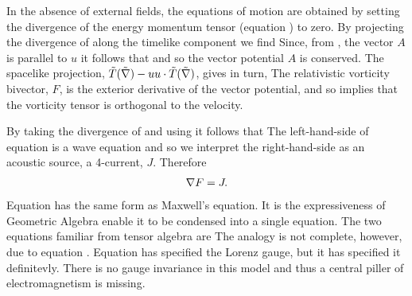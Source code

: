 In the absence of external fields, the equations of motion are obtained by setting the 
 divergence of the energy momentum tensor (equation ) to zero.
By projecting the divergence of  along the timelike component we find
Since, from , the vector $A$ is parallel to $u$  it follows that 
and so the vector potential $A$ is conserved.
The spacelike projection,
$\tilde{T}(\tilde{\nabla}) - u u\cdot \tilde{T}(\tilde{\nabla})$, gives in turn,
The relativistic vorticity bivector, $F$, is the exterior derivative  of the vector potential, 
and so  implies that the vorticity tensor is orthogonal to the velocity.

By taking the divergence of  and using  it follows that 
The left-hand-side of equation  is a wave equation and so we interpret the right-hand-side as an acoustic source,
a 4-current, $J$.
Therefore 
\begin{align}
\label{eqn:Maxwell}
\nabla F =J.
\end{align}
Equation  has the same form as Maxwell's equation. 
It is the expressiveness of Geometric Algebra enable it to be condensed into a single equation.
The two equations familiar from tensor algebra are 
The analogy is not complete, however, due to equation .
Equation  has specified the Lorenz gauge,
but it has specified it definitevly.
There is no gauge invariance in this model and thus a central piller of electromagnetism is missing.

